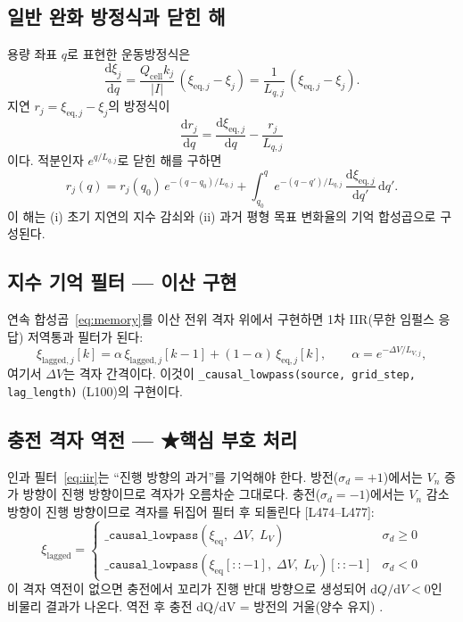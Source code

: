 \documentclass[11pt,a4paper]{article}
\newcommand{\dd}{\mathrm{d}}
\newcommand{\eq}{\mathrm{eq}}
\newcommand{\cell}{\mathrm{cell}}
\begin{document}
\subsection{일반 완화 방정식과 닫힌 해}

용량 좌표 $q$로 표현한 운동방정식은
\begin{equation}
  \frac{\dd\xi_j}{\dd q} = \frac{Q_\cell k_j}{|I|}\,(\xi_{\eq,j}-\xi_j)
  = \frac{1}{L_{q,j}}\,(\xi_{\eq,j}-\xi_j).
  \label{eq:relaxq}
\end{equation}
지연 $r_j = \xi_{\eq,j}-\xi_j$의 방정식이
\begin{equation}
  \frac{\dd r_j}{\dd q} = \frac{\dd\xi_{\eq,j}}{\dd q} - \frac{r_j}{L_{q,j}}
  \label{eq:Lq_eq}
\end{equation}
이다. 적분인자 $e^{q/L_{q,j}}$로 닫힌 해를 구하면
\begin{equation}
  r_j(q) = r_j(q_0)\,e^{-(q-q_0)/L_{q,j}}
  + \int_{q_0}^q e^{-(q-q')/L_{q,j}}\,\frac{\dd\xi_{\eq,j}}{\dd q'}\,\dd q'.
  \label{eq:memory}
\end{equation}
이 해는 (i) 초기 지연의 지수 감쇠와 (ii) 과거 평형 목표 변화율의 기억 합성곱으로 구성된다.

\subsection{지수 기억 필터 — 이산 구현}

연속 합성곱~\eqref{eq:memory}를 이산 전위 격자 위에서 구현하면
1차 IIR(무한 임펄스 응답) 저역통과 필터가 된다:
\begin{equation}
  \xi_{\mathrm{lagged},j}[k] = \alpha\,\xi_{\mathrm{lagged},j}[k-1]
  + (1-\alpha)\,\xi_{\eq,j}[k],\qquad
  \alpha = e^{-\Delta V/L_{V,j}},
  \label{eq:iir}
\end{equation}
여기서 $\Delta V$는 격자 간격이다.
이것이 \texttt{\_causal\_lowpass(source, grid\_step, lag\_length)} (L100)의 구현이다.

\subsection{충전 격자 역전 — ★핵심 부호 처리}

인과 필터~\eqref{eq:iir}는 ``진행 방향의 과거''를 기억해야 한다.
방전($\sigma_d=+1$)에서는 $V_n$ 증가 방향이 진행 방향이므로
격자가 오름차순 그대로다.
충전($\sigma_d=-1$)에서는 $V_n$ 감소 방향이 진행 방향이므로
격자를 뒤집어 필터 후 되돌린다 [L474--L477]:
\begin{equation}
  \xi_{\mathrm{lagged}} = \begin{cases}
    \texttt{\_causal\_lowpass}(\xi_{\eq},\;\Delta V,\;L_V) & \sigma_d \ge 0\\
    \texttt{\_causal\_lowpass}(\xi_{\eq}[::-1],\;\Delta V,\;L_V)[::-1] & \sigma_d < 0
  \end{cases}
  \label{eq:reverse}
\end{equation}
이 격자 역전이 없으면 충전에서 꼬리가 진행 반대 방향으로 생성되어
$\dd Q/\dd V < 0$인 비물리 결과가 나온다.
역전 후 충전 dQ/dV = 방전의 거울(양수 유지) \checkmark.
\end{document}
